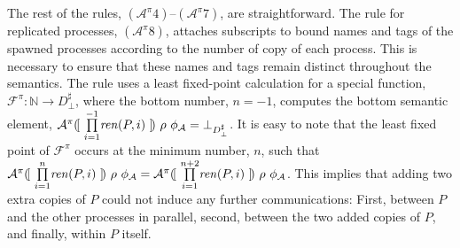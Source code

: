 \documentclass[10pt,a4paper,final,oneside,fleqn]{book}
\begin{document}
The rest of the rules, $(\mathcal{A}^\pi 4)$--$(\mathcal{A}^\pi 7)$, are straightforward. The rule for replicated processes, $(\mathcal{A}^\pi 8)$, attaches subscripts to bound names and tags of the spawned processes according to the number of copy of each process. This is necessary to ensure that these names and tags remain distinct throughout the semantics. The rule uses a least fixed-point calculation for a special function, $\mathcal{F}^\pi:\mathbb{N}\to D^\sharp_\bot$, where the bottom number, $n=-1$, computes the bottom semantic element, $\mathcal{A}^\pi(\![~\underset{i=1}{\overset{-1}{\prod}}\mbox{{\itshape ren\/}}(P,i)~]\!)~\rho~\phi_\mathcal{A}=\bot_{D^{\sharp}_\bot}$. It is easy to note that the least fixed point of $\mathcal{F}^\pi$ occurs at the minimum number, $n$, such that $\mathcal{A}^{\pi}(\![~\underset{i=1}{\overset{n}{\prod}}\mbox{{\itshape ren\/}}(P,i)~]\!)~\rho~\phi_\mathcal{A}=\mathcal{A}^\pi(\![~\underset{i=1}{\overset{n+2}{\prod}}\mbox{{\itshape ren\/}}(P,i)~]\!)~\rho~\phi_\mathcal{A}$.  This implies that adding two extra copies of $P$ could not induce any further communications: First, between $P$ and the other processes in parallel, second, between the two added copies of $P$, and finally, within $P$ itself.
\end{document}
